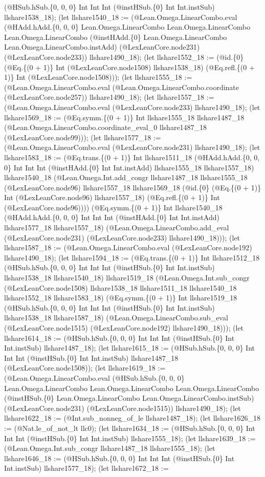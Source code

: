 \documentclass[11pt]{article}
\begin{document}
(@HSub.hSub.\{0, 0, 0\} Int Int Int (@instHSub.\{0\} Int Int.instSub) llshare1538\_18); (let llshare1540\_18 := (@Lean.Omega.LinearCombo.eval (@HAdd.hAdd.\{0, 0, 0\} Lean.Omega.LinearCombo Lean.Omega.LinearCombo Lean.Omega.LinearCombo (@instHAdd.\{0\} Lean.Omega.LinearCombo Lean.Omega.LinearCombo.instAdd) (@LexLeanCore.node231) (@LexLeanCore.node233)) llshare1490\_18); (let llshare1552\_18 := (@id.\{0\} (@Eq.\{(0 + 1)\} Int (@LexLeanCore.node1508) llshare1538\_18) (@Eq.refl.\{(0 + 1)\} Int (@LexLeanCore.node1508))); (let llshare1555\_18 := (@Lean.Omega.LinearCombo.eval (@Lean.Omega.LinearCombo.coordinate (@LexLeanCore.node257)) llshare1490\_18); (let llshare1557\_18 := (@Lean.Omega.LinearCombo.eval (@LexLeanCore.node233) llshare1490\_18); (let llshare1569\_18 := (@Eq.symm.\{(0 + 1)\} Int llshare1555\_18 llshare1487\_18 (@Lean.Omega.LinearCombo.coordinate\_eval\_0 llshare1487\_18 (@LexLeanCore.node99))); (let llshare1577\_18 := (@Lean.Omega.LinearCombo.eval (@LexLeanCore.node231) llshare1490\_18); (let llshare1583\_18 := (@Eq.trans.\{(0 + 1)\} Int llshare1511\_18 (@HAdd.hAdd.\{0, 0, 0\} Int Int Int (@instHAdd.\{0\} Int Int.instAdd) llshare1555\_18 llshare1557\_18) llshare1540\_18 (@Lean.Omega.Int.add\_congr llshare1487\_18 llshare1555\_18 (@LexLeanCore.node96) llshare1557\_18 llshare1569\_18 (@id.\{0\} (@Eq.\{(0 + 1)\} Int (@LexLeanCore.node96) llshare1557\_18) (@Eq.refl.\{(0 + 1)\} Int (@LexLeanCore.node96)))) (@Eq.symm.\{(0 + 1)\} Int llshare1540\_18 (@HAdd.hAdd.\{0, 0, 0\} Int Int Int (@instHAdd.\{0\} Int Int.instAdd) llshare1577\_18 llshare1557\_18) (@Lean.Omega.LinearCombo.add\_eval (@LexLeanCore.node231) (@LexLeanCore.node233) llshare1490\_18))); (let llshare1587\_18 := (@Lean.Omega.LinearCombo.eval (@LexLeanCore.node192) llshare1490\_18); (let llshare1594\_18 := (@Eq.trans.\{(0 + 1)\} Int llshare1512\_18 (@HSub.hSub.\{0, 0, 0\} Int Int Int (@instHSub.\{0\} Int Int.instSub) llshare1538\_18 llshare1540\_18) llshare1519\_18 (@Lean.Omega.Int.sub\_congr (@LexLeanCore.node1508) llshare1538\_18 llshare1511\_18 llshare1540\_18 llshare1552\_18 llshare1583\_18) (@Eq.symm.\{(0 + 1)\} Int llshare1519\_18 (@HSub.hSub.\{0, 0, 0\} Int Int Int (@instHSub.\{0\} Int Int.instSub) llshare1538\_18 llshare1587\_18) (@Lean.Omega.LinearCombo.sub\_eval (@LexLeanCore.node1515) (@LexLeanCore.node192) llshare1490\_18))); (let llshare1614\_18 := (@HSub.hSub.\{0, 0, 0\} Int Int Int (@instHSub.\{0\} Int Int.instSub) llshare1487\_18); (let llshare1615\_18 := (@HSub.hSub.\{0, 0, 0\} Int Int Int (@instHSub.\{0\} Int Int.instSub) llshare1487\_18 (@LexLeanCore.node1508)); (let llshare1619\_18 := (@Lean.Omega.LinearCombo.eval (@HSub.hSub.\{0, 0, 0\} Lean.Omega.LinearCombo Lean.Omega.LinearCombo Lean.Omega.LinearCombo (@instHSub.\{0\} Lean.Omega.LinearCombo Lean.Omega.LinearCombo.instSub) (@LexLeanCore.node231) (@LexLeanCore.node1515)) llshare1490\_18); (let llshare1622\_18 := (@Int.sub\_nonneg\_of\_le llshare1487\_18); (let llshare1626\_18 := (@Nat.le\_of\_not\_lt llc0); (let llshare1634\_18 := (@HSub.hSub.\{0, 0, 0\} Int Int Int (@instHSub.\{0\} Int Int.instSub) llshare1555\_18); (let llshare1639\_18 := (@Lean.Omega.Int.sub\_congr llshare1487\_18 llshare1555\_18); (let llshare1646\_18 := (@HSub.hSub.\{0, 0, 0\} Int Int Int (@instHSub.\{0\} Int Int.instSub) llshare1577\_18); (let llshare1672\_18 := 
\end{document}
